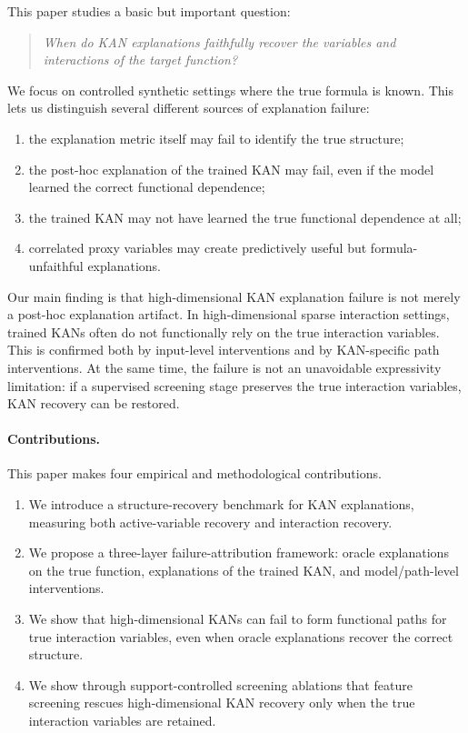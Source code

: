 \documentclass[11pt]{article}
\begin{document}
This paper studies a basic but important question:

\begin{quote}
\emph{When do KAN explanations faithfully recover the variables and interactions of the target function?}
\end{quote}

We focus on controlled synthetic settings where the true formula is known.
This lets us distinguish several different sources of explanation failure:
\begin{enumerate}[leftmargin=2em]
    \item the explanation metric itself may fail to identify the true structure;
    \item the post-hoc explanation of the trained KAN may fail, even if the model learned the correct functional dependence;
    \item the trained KAN may not have learned the true functional dependence at all;
    \item correlated proxy variables may create predictively useful but formula-unfaithful explanations.
\end{enumerate}

Our main finding is that high-dimensional KAN explanation failure is not merely a post-hoc explanation artifact.
In high-dimensional sparse interaction settings, trained KANs often do not functionally rely on the true interaction variables.
This is confirmed both by input-level interventions and by KAN-specific path interventions.
At the same time, the failure is not an unavoidable expressivity limitation: if a supervised screening stage preserves the true interaction variables, KAN recovery can be restored.

\paragraph{Contributions.}
This paper makes four empirical and methodological contributions.
\begin{enumerate}[leftmargin=2em]
    \item We introduce a structure-recovery benchmark for KAN explanations, measuring both active-variable recovery and interaction recovery.
    \item We propose a three-layer failure-attribution framework: oracle explanations on the true function, explanations of the trained KAN, and model/path-level interventions.
    \item We show that high-dimensional KANs can fail to form functional paths for true interaction variables, even when oracle explanations recover the correct structure.
    \item We show through support-controlled screening ablations that feature screening rescues high-dimensional KAN recovery only when the true interaction variables are retained.
\end{enumerate}
\end{document}
